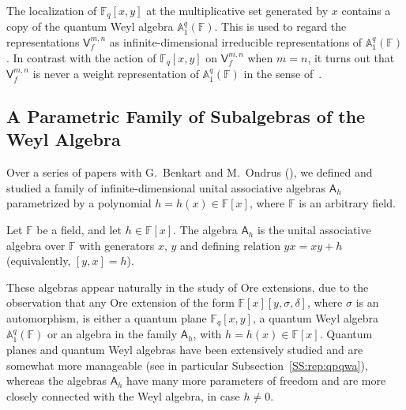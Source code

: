 \documentclass{commat}
\newcommand{\FF}{\mathbb{F}}
\newcommand{\wa}[1][1]{\mathbb{A}_{#1}}
\newcommand{\A}{\mathsf{A}}
\begin{document}
The localization of $\FF_q[x, y]$ at the multiplicative set generated by $x$ contains a copy of the quantum Weyl algebra $\wa^q(\FF)$. This is used to regard the representations $\mathsf{V}^{m,n}_{f}$ as infinite-dimensional irreducible representations of $\wa^q(\FF)$. In contrast with the action of $\FF_q[x, y]$ on $\mathsf{V}^{m,n}_{f}$ when $m=n$, it turns out that $\mathsf{V}^{m,n}_{f}$ is never a weight representation of $\wa^q(\FF)$ in the sense of~\cite{vB97}.

\subsection{A Parametric Family of Subalgebras of the Weyl Algebra}\label{SS:rep:ah}

Over a series of papers with G.\ Benkart and M.\ Ondrus (\cite{BLO15tams,BLO13,BLO15ja}), we defined and studied a family of infinite-dimensional unital associative algebras $\A_h$ parametrized by a polynomial $h
= h(x) \in \FF[x]$,
where $\FF$ is an arbitrary field.   


\begin{definition}\label{D:rep:ah}
	Let $\FF$ be a field, and let $h \in \FF[x]$.  The algebra  $\A_h$ is  the unital associative algebra over $\FF$ with generators $x$, $y$ and defining relation $yx = xy + h$ (equivalently,  $[y,x] = h$). 
\end{definition}

These algebras appear naturally in the study of Ore extensions, due to the observation that any Ore extension of the form $\FF[x][y,\sigma,\delta]$, where $\sigma$ is an automorphism, is either a quantum plane $\FF_q[x, y]$, a quantum Weyl algebra $\wa^q(\FF)$ or an algebra in the family $\A_h$, with $h = h(x) \in \FF[x]$. Quantum planes and quantum Weyl algebras have been extensively studied and are somewhat more manageable (see in particular Subsection~\ref{SS:rep:qpqwa}), whereas the algebras $\A_h$ have many more parameters of freedom and are more closely connected with the Weyl algebra, in case $h\neq 0$.
\end{document}
